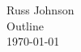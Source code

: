 \documentclass[11pt,a4paper]{article}
\begin{document}
\begin{flushright}
Russ Johnson\\
Outline\\
\today\\
\end{flushright}
~
\end{document}

